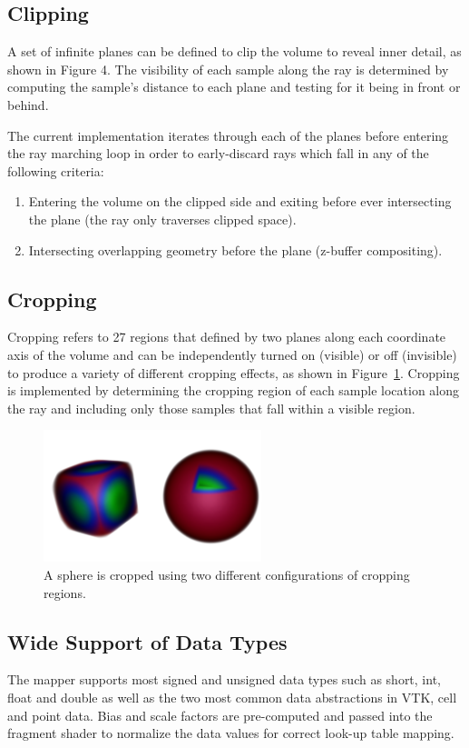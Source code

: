\subsection{Clipping}
A set of infinite planes can be defined to clip the volume to reveal inner
detail, as shown in Figure 4.  The visibility of each sample along the ray
is determined by computing the sample's distance to each plane and testing
for it being in front or behind.

The current implementation iterates through each of the planes before entering
the ray marching loop in order to early-discard rays which fall in any of the
following criteria:

\begin{enumerate}
\item Entering the volume on the clipped side and exiting before ever
	intersecting the plane (the ray only traverses clipped space).
\item Intersecting overlapping geometry before the plane (z-buffer compositing).
\end{enumerate}

\subsection{Cropping} Cropping refers to 27 regions that defined by two
planes along each coordinate axis of the volume and can be independently turned
on (visible) or off (invisible) to produce a variety of different cropping
effects, as shown in Figure~\ref{fig:cropping}. Cropping is implemented by
determining the cropping region of each sample location along the ray and
including only those samples that fall within a visible region.

\begin{figure}[ht]
  \centering
  \includegraphics[width=2.5in]{SphereCropping.png}
  \caption{A sphere is cropped using two different configurations of cropping regions.}
  \label{fig:cropping}
\end{figure}

\subsection{Wide Support of Data Types}
The mapper supports most signed and unsigned data types such as short, int,
float and double as well as the two most common data abstractions in VTK,
cell and point data.  Bias and scale factors are pre-computed and passed into
the fragment shader to normalize the data values for correct look-up table
mapping.

